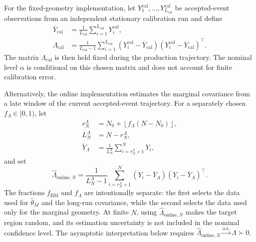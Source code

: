 \documentclass[showpacs,amsmath,amssymb,twocolumn,prx,superscriptaddress,10pt,aps,nofootinbib]{revtex4-2}
\begin{document}
For the fixed-geometry implementation, let $Y_1^{\mathrm{cal}},\ldots,Y_{L_{\mathrm{cal}}}^{\mathrm{cal}}$ be accepted-event observations from an independent stationary calibration run and define
\begin{equation}
\label{eq:app_lambda_calibration}
\begin{aligned}
    \overline Y_{\mathrm{cal}}
    &=
    \frac{1}{L_{\mathrm{cal}}}
    \sum_{i=1}^{L_{\mathrm{cal}}}Y_i^{\mathrm{cal}},\\
    \Lambda_{\mathrm{cal}}
    &=
    \frac{1}{L_{\mathrm{cal}}-1}
    \sum_{i=1}^{L_{\mathrm{cal}}}
    (Y_i^{\mathrm{cal}}-\overline Y_{\mathrm{cal}})
    (Y_i^{\mathrm{cal}}-\overline Y_{\mathrm{cal}})^\top.
\end{aligned}
\end{equation}
The matrix $\Lambda_{\mathrm{cal}}$ is then held fixed during the production trajectory. The nominal level $\alpha$ is conditional on this chosen matrix and does not account for finite calibration error.

Alternatively, the online implementation estimates the marginal covariance from a late window of the current accepted-event trajectory. For a separately chosen $f_\Lambda\in[0,1)$, let
\begin{equation}
\label{eq:app_lambda_online_window}
\begin{aligned}
    r_N^\Lambda
    &=
    N_0+
    \left\lfloor
        f_\Lambda(N-N_0)
    \right\rfloor,\\
    L_N^\Lambda
    &=N-r_N^\Lambda,\\
    \overline Y_\Lambda
    &=
    \frac{1}{L_N^\Lambda}
    \sum_{i=r_N^\Lambda+1}^{N}Y_i,
\end{aligned}
\end{equation}
and set
\begin{equation}
\label{eq:app_lambda_online_estimator}
    \widehat\Lambda_{\mathrm{online},N}
    =
    \frac{1}{L_N^\Lambda-1}
    \sum_{i=r_N^\Lambda+1}^{N}
    (Y_i-\overline Y_\Lambda)
    (Y_i-\overline Y_\Lambda)^\top.
\end{equation}
The fractions $f_{\mathrm{BM}}$ and $f_\Lambda$ are intentionally separate: the first selects the data used for $\widehat\theta_M$ and the long-run covariance, while the second selects the data used only for the marginal geometry. At finite $N$, using $\widehat\Lambda_{\mathrm{online},N}$ makes the target region random, and its estimation uncertainty is not included in the nominal confidence level. The asymptotic interpretation below requires $\widehat\Lambda_{\mathrm{online},N}\xrightarrow{\mathrm{a.s.}}\Lambda\succ0$.
\end{document}
